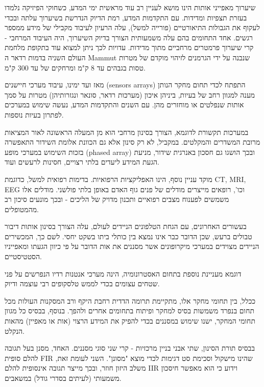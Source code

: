 שיערוך מאפייני אותות הינו מושא לעניין רב עוד מראשית ימי המדע, כשחוקי הפיזיקה נלמדו בעזרת תצפיות ומדידות.
עם התקדמות המדע, רמת הדיוק הנדרשת בשיערוך עלתה ובכדי לעקוף את הגבולות התיאורטיים (פורייה למשל), עלה הרעיון לעיבוד מקבילי של מידע ממספר רגשים.
אחד התחומים בהם עלה משמעותית הצורך בדיוק השיערוך, היה העיבוד המרחבי - קרי שיערוך פרמטרים מרחביים מתוך מדידות. 
עדויות לכך ניתן למצוא עוד בתקופת מלחמת העולם השניה בדמות רדאר ה
\textenglish{Mammut}
שנבנה על ידי הגרמנים לזיהוי מוקדם של מטרות טסות בגבהים עד 8 ק"מ ומרחקים של עד 300 ק"מ.
\par
מאז ועד ימינו, עיבוד מערכי חיישנים
\textenglish{(sensors arrays)}
התפתח לכדי תחום מחקר הנותן מענה למגוון רחב של בעיות, ביניהן איכון (מערכות רדאר, סונאר ונגזרותיהן) מטרות על סמך אותות שנפלטים או מוחזרים מהן.
עם השנים והתקדמות המדע, נעשה שימוש במערכים לפתרון בעיות נוספות.
\par
במערכות תקשורת לדוגמא, הצורך בסינון מרחבי הוא מן המעלה הראשונה לאור המציאות מרובת המשדרים והמקלטים. במקביל, לא רק סינון אלא גם הכוונת אלומת השידור התאפשרה בזכות השימוש במערכי מופע
\textenglish{(phased array)}
ובכך הושגו גם חסכון באנרגית שידור, מניעת הגעת המידע ליעדים בלתי רצויים, חסינות לרעשים ועוד.
\par
מוקד עניין נוסף, הינו האפליקציות הרפואיות. 
בדימות רפואית למשל, כדוגמת 
\textenglish{CT, MRI, EEG}
וכו', רופאים מייצרים מודלים של פנים גוף האדם באופן בלתי פולשני.
מודלים אלו משמשים לפענוח מצבים רפואיים ותכנון מדויק של הליכים - ובכך מונעים סיכון רב מהמטופלים.
\par
בעשורים האחרונים, עם הגחת הטלפונים הניידים לעולם, עלה הצורך בסינון אותות דיבור טבולים ברעש, שכן הדובר כבר אינו נמצא בין כותלי ביתו בשקט יחסי.
לשם כך, המכשירים הניידים מצוידים במערכי מיקרופונים אשר מסננים את אות הדובר על פי כיוון הגעתו ומאפייניו הסטטיסטיים.
\par
דוגמא מעניינת נוספת בתחום האסטרונומיה, הינה מערכי אנטנות רדיו הנפרשים על פני שטחים עצומים בכדי לממש טלסקופים רבי עוצמה ודיוק. 
\par
ככלל, בין תחומי מחקר אלו, מתקיימת תרומה הדדית רחבת היקף ורב המסקנות העולות מכל תחום בנפרד משמשות בסיס למחקר ופיתוח בתחומים אחרים ולהפך. 
בנוסף, בבסיס כל מגוון תחומי המחקר, ישנו שימוש במסננים בכדי להפיק את המידע הרצוי (אות או מאפיין) מהאות הנקלט.  
\par
בבסיס תורת הסינון, שתי אבני בניין מרכזיות - קרי שני סוגי מסננים.
האחד, מסנן בעל תגובה להלם סופית 
\textenglish{FIR}
שהינו מישקול וסכימת סט דגימות לכדי מוצא "מסונן".
השני לעומת זאת, משלב היזון חוזר, ובכך מייצר תגובה אינסופית להלם 
\textenglish{IIR}
וידוע כי הוא מאפשר חיסכון משמעותי (לעיתים בסדרי גודל) במשאבים.
